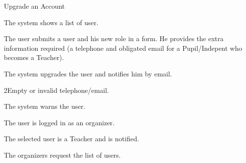 
\begin{uc}{Upgrade an Account}

    \begin{uc-mss}
    \item The system shows a list of user.
    \item The user submits a user and his new role in a form. He provides the
        extra information required (a telephone and obligated email for a
        Pupil/Indepent who becomes a Teacher).
    \item The system upgrades the user and notifies him by email.
    \end{uc-mss}

    \begin{uc-ext}
        
        \begin{uc-fail}{2}{Empty or invalid telephone/email.}
            \item The system warns the user.
        \end{uc-fail}

    \end{uc-ext}

    \begin{uc-pre}
    \item The user is logged in as an organizer.
    \end{uc-pre}

    \begin{uc-post}
    \item The selected user is a Teacher and is notified.
    \end{uc-post}

    \begin{uc-trig}
        The organizers request the list of users.
    \end{uc-trig}

\end{uc}

